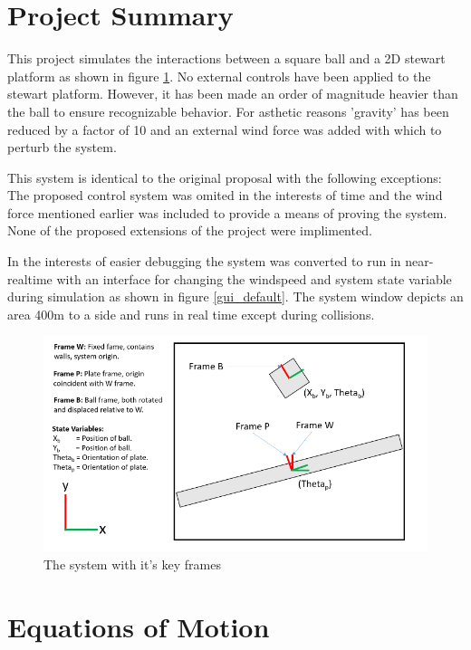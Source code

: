 \documentclass[12pt]{article}
\begin{document}
\maketitle

\section{Project Summary}
This project simulates the interactions between a square ball and a 2D stewart platform as shown in figure \ref{frame_diagram}. No external controls have been
applied to the stewart platform. However, it has been made an order of magnitude heavier than the ball to ensure recognizable behavior. For asthetic reasons 'gravity' has been reduced by a factor of 10 and an external wind force was added with which to perturb the system. 

This system is identical to the original proposal with the following exceptions: The proposed control system was omited in the interests of time and the wind force mentioned earlier was included to provide a means of proving the system. None of the proposed extensions of the project were implimented.

In the interests of easier debugging the system was converted to run in near-realtime with an interface for changing the windspeed and system state variable during simulation as shown in figure \ref{gui_default}. The system window depicts an area 400m to a side and runs in real time except during collisions. 



\begin{figure}[h]
\centering
\includegraphics[width=12cm]{diagram.png}
\caption{The system with it's key frames}
\label{frame_diagram}

\end{figure}

\section{Equations of Motion}
\end{document}
